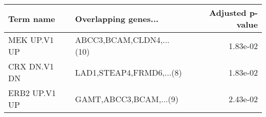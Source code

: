 \begin{tabular}{llr}
\toprule
    Term name &     Overlapping genes... &  Adjusted p-value \\
\midrule
 MEK UP.V1 UP & ABCC3,BCAM,CLDN4,...(10) &          1.83e-02 \\
 CRX DN.V1 DN & LAD1,STEAP4,FRMD6,...(8) &          1.83e-02 \\
ERB2 UP.V1 UP &   GAMT,ABCC3,BCAM,...(9) &          2.43e-02 \\
\bottomrule
\end{tabular}
